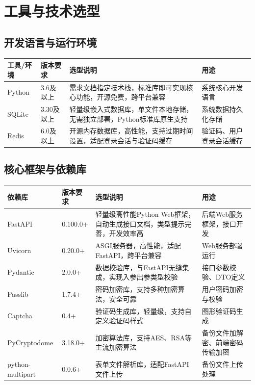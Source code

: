 \documentclass[12pt, a4paper]{article}
\begin{document}
\section{工具与技术选型}

\subsection{开发语言与运行环境}

\begin{table}[H]
    \centering
    \begin{tabularx}{\linewidth}{|l|l|X|X|}
        \hline
        工具/环境 & 版本要求 & 选型说明 & 用途 \\
        \hline
        Python & 3.6及以上 & 需求文档指定技术栈，标准库即可实现核心功能，开源免费，跨平台兼容 & 系统核心开发语言 \\
        \hline
        SQLite & 3.30及以上 & 轻量级嵌入式数据库，单文件本地存储，无需独立部署，Python标准库原生支持 & 系统数据持久化存储 \\
        \hline
        Redis & 6.0及以上 & 开源内存数据库，高性能，支持过期时间设置，适配登录会话与验证码缓存 & 验证码、用户登录会话缓存 \\
        \hline
    \end{tabularx}
\end{table}

\subsection{核心框架与依赖库}

\begin{table}[H]
    \centering
    \begin{tabularx}{\linewidth}{|l|l|X|X|}
        \hline
        依赖库 & 版本要求 & 选型说明 & 用途 \\
        \hline
        FastAPI & 0.100.0+ & 轻量级高性能Python Web框架，自动生成接口文档，类型提示完善，开发效率高 & 后端Web服务框架，接口开发 \\
        \hline
        Uvicorn & 0.20.0+ & ASGI服务器，高性能，适配FastAPI，跨平台兼容 & Web服务部署运行 \\
        \hline
        Pydantic & 2.0.0+ & 数据校验库，与FastAPI无缝集成，实现入参出参类型校验 & 接口参数校验、DTO定义 \\
        \hline
        Passlib & 1.7.4+ & 密码加密库，支持多种加密算法，安全可靠 & 用户密码加密与校验 \\
        \hline
        Captcha & 0.4+ & 验证码生成库，轻量级，支持自定义验证码样式 & 图形验证码生成 \\
        \hline
        PyCryptodome & 3.18.0+ & 加密算法库，支持AES、RSA等主流加密算法 & 备份文件加解密、前端密码传输加密 \\
        \hline
        python-multipart & 0.0.6+ & 表单文件解析库，适配FastAPI文件上传 & 备份文件上传处理 \\
        \hline
    \end{tabularx}
\end{table}
\end{document}
